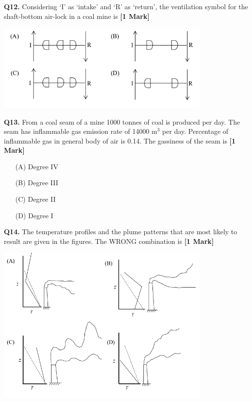 \documentclass[11pt]{article}
\newcommand{\questiona}[2]{
    \noindent\textbf{Q#2.} #1 \hfill \textbf{[1 Mark]}
}
\begin{document}
\questiona{Considering ‘I’ as ‘intake’ and ‘R’ as ‘return’, the ventilation symbol for the shaft-bottom air-lock in a coal mine is}{12}
\begin{center}
\includegraphics[width=0.8\textwidth]{figures/12.png}
\end{center}

\vspace{0.5cm}

\questiona{From a coal seam of a mine 1000 tonnes of coal is produced per day. The seam has inflammable gas emission rate of 14000 m\(^3\) per day. Percentage of inflammable gas in general body of air is 0.14. The gassiness of the seam is}{13}
\begin{enumerate}
    \item[(A)] Degree IV
    \item[(B)] Degree III
    \item[(C)] Degree II
    \item[(D)] Degree I
\end{enumerate}
\vspace{0.5cm}

\questiona{The temperature profiles and the plume patterns that are most likely to result are given in the figures. The WRONG combination is}{14}
\begin{center}
\includegraphics[width=0.8\textwidth]{figures/14.png}
\end{center}
\end{document}
